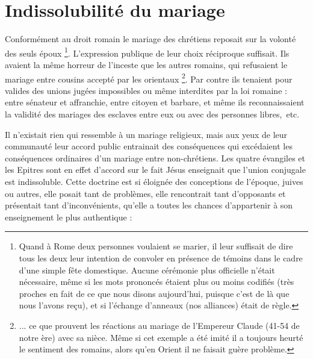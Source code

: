  \section{Indissolubilité du mariage}

 Conformément au droit romain le mariage des chrétiens reposait sur la volonté des seuls époux
\footnote{Quand à Rome deux personnes voulaient se marier, il leur suffisait de dire tous les deux leur intention de convoler en présence de témoins dans le cadre d'une simple fête domestique. Aucune cérémonie plus officielle n'était nécessaire, même si les mots prononcés étaient plus ou moins codifiés (très proches en fait de ce que nous disons aujourd'hui, puisque c'est de là que nous l'avons reçu), et si l'échange d'anneaux (nos alliances) était de règle.}. L'expression publique de leur choix réciproque suffisait. Ils avaient la même horreur de l'inceste que les autres romains, qui refusaient le mariage entre cousins accepté par les orientaux
\footnote{... ce que prouvent les réactions au mariage de l'Empereur Claude (41-54 de notre ère) avec sa nièce. Même si cet exemple a été imité il a toujours heurté le sentiment des romains, alors qu'en Orient il ne faisait guère problème.}. Par contre ils tenaient pour valides des unions jugées impossibles ou même interdites par la loi romaine : entre sénateur et affranchie, entre citoyen et barbare, et même ils reconnaissaient la validité des mariages des esclaves entre eux ou avec des personnes libres,~etc.

 Il n'existait rien qui ressemble à un mariage religieux, mais aux yeux de leur communauté leur accord public entrainait des conséquences qui excédaient les conséquences ordinaires d'un mariage entre non-chrétiens.  Les quatre évangiles et les Epitres sont en effet d'accord sur le fait Jésus enseignait que l'union conjugale est indissoluble. Cette doctrine est si éloignée des conceptions de l'époque, juives ou autres, elle posait tant de problèmes, elle rencontrait tant d'opposants et présentait tant d'inconvénients, qu'elle a toutes les chances d'appartenir à son enseignement le plus authentique :

